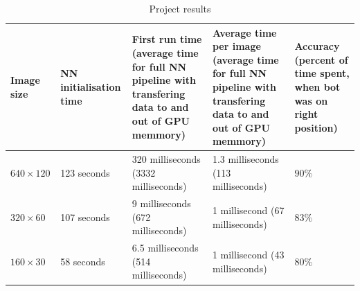 \begin{enumerate}
\begin{table}[h]
    \centering 
    \begin{tabular}{|p{1.7cm}|p{2.3cm}|p{5.2cm}|p{5.2cm}|p{1.7cm}|}
        \hline
        Image size & NN initialisation time & First run time (average time for full NN pipeline with transfering data to and out of GPU memmory)& Average time per image (average time for full NN pipeline with transfering data to and out of GPU memmory)& Accuracy (percent of time spent, when bot was on right position)  \\ \hline
        $640 \times 120$ &  123 seconds & 320 milliseconds (3332 milliseconds) & 1.3 milliseconds (113 milliseconds) & $90\%$ \\ \hline
        $320 \times 60$ &  107 seconds & 9 milliseconds (672 milliseconds) & 1 millisecond (67 milliseconds)& $83\%$\\ \hline
        $160 \times 30$ &  58 seconds & 6.5 milliseconds (514 milliseconds) & 1 millisecond (43 milliseconds)& $80\%$\\ \hline
    \end{tabular}
    \caption{Project results}\label{tab:p_results}
\end{table}

\end{enumerate}
